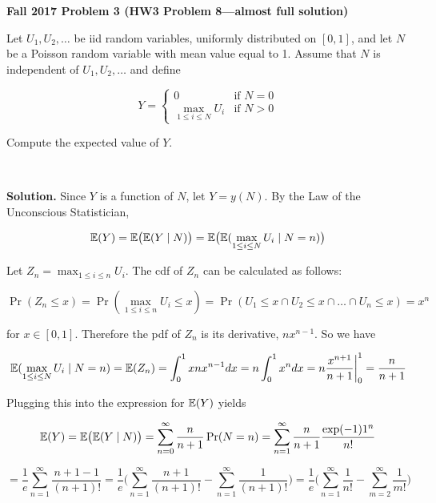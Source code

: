 \textbf{Fall 2017 Problem 3 (HW3 Problem 8---almost full solution)}

Let \(U_1, U_2, \ldots\) be iid random variables, uniformly distributed on \([0, 1]\), and let \(N\) be a Poisson random variable with mean value equal to 1. Assume that \(N\) is independent of \(U_1, U_2, \ldots\) and define 

\[
Y = \begin{cases}
0 & \text{if } N = 0 \\
\underset{{1 \leq i \leq N}}\max U_i & \text{if } N > 0
\end{cases}
\]

Compute the expected value of \(Y\).


\

\textbf{Solution.} Since \(Y\) is a function of \(N\), let \(Y = y(N)\). By the Law of the Unconscious Statistician,


\[
\mathbb{E}(Y) = \mathbb{E} \big( \mathbb{E}( Y \mid N) \big) = \mathbb{E} \big( \mathbb{E}( \max_{1 \leq i \leq N} U_i \mid N = n ) \big) 
\]

Let \( Z_n = \max_{1 \leq i \leq n} U_i  \). The cdf of \(Z_n\) can be calculated as follows:

\[
\Pr(Z_n \leq x) = \Pr(  \max_{1 \leq i \leq n} U_i  \leq x) = \Pr(U_1 \leq x \cap U_2 \leq x \cap \ldots \cap U_n \leq x) = x^n
\]

for \(x \in [0, 1]\). Therefore the pdf of \(Z_n\) is its derivative, \(nx^{n-1}\). So we have

\[
 \mathbb{E}( \max_{1 \leq i \leq N} U_i \mid N = n ) = \mathbb{E}(Z_n) = \int_{0}^1 x n x^{n-1} dx = n \int_0^1 x^n dx = n \frac{x^{n+1}}{n+1} \bigg|_0^1 = \frac{n}{n+1}
\]

Plugging this into the expression for \(\mathbb{E}(Y)\) yields

\[
\mathbb{E}(Y) = \mathbb{E} \big( \mathbb{E}( Y \mid N) \big) = \sum_{n=0}^\infty \frac{n}{n+1} \Pr(N = n) = \sum_{n=1}^\infty \frac{n}{n+1} \frac{\exp(-1)1^n}{n!} 
\]

\[
=\frac{1}{e} \sum_{n=1}^\infty \frac{n + 1  - 1}{(n+1)!} =\frac{1}{e}\bigg(  \sum_{n=1}^\infty \frac{n + 1  }{(n+1)!} -  \sum_{n=1}^\infty \frac{ 1  }{(n+1)!}  \bigg) =\frac{1}{e}\bigg(  \sum_{n=1}^\infty \frac{1  }{n!} -  \sum_{m=2}^\infty \frac{ 1  }{m!}  \bigg) 
\]

